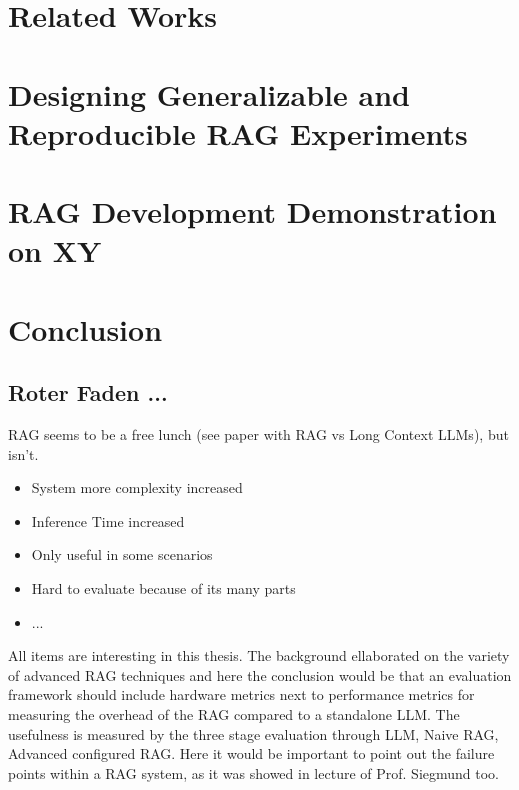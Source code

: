 \documentclass[english,master]{swsLeipzig}
\begin{document}
\chapter{Related Works}\label{chap:relwork}


\chapter{Designing Generalizable and Reproducible RAG Experiments}\label{chap:design}


\chapter{RAG Development Demonstration on XY}\label{chap:Experiment}


\chapter{Conclusion}\label{chap:Conclusion}


\section{Roter Faden ...}
RAG seems to be a free lunch (see paper with RAG vs Long Context LLMs), but isn't. 
\begin{itemize}
  \item System more complexity increased
  \item Inference Time increased
  \item Only useful in some scenarios 
  \item Hard to evaluate because of its many parts
  \item ...
\end{itemize}

All items are interesting in this thesis. The background ellaborated on the variety of advanced RAG techniques and here the conclusion would be that an evaluation framework should include hardware metrics next to performance metrics for measuring the overhead of the RAG compared to a standalone LLM. The usefulness is measured by the three stage evaluation through LLM, Naive RAG, Advanced configured RAG. Here it would be important to point out the failure points within a RAG system, as it was showed in lecture of Prof. Siegmund too. 


\end{document}
